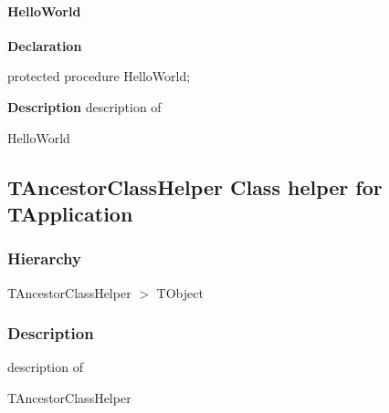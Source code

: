 \documentclass{report}
\newif\ifpdf
\begin{document}
\paragraph*{HelloWorld}\hspace*{\fill}

\label{ok_class_record_helpers.TMyRecordHelper-HelloWorld}
\begin{list}{}{
\setlength{\itemindent}{0cm}
\setlength{\listparindent}{0cm}
\setlength{\leftmargin}{\evensidemargin}
\addtolength{\leftmargin}{\tmplength}
\settowidth{\labelsep}{X}
\addtolength{\leftmargin}{\labelsep}
\setlength{\labelwidth}{\tmplength}
}
\item[\textbf{Declaration}\hfill]
\ifpdf
\begin{flushleft}
\fi
\begin{ttfamily}
protected procedure HelloWorld;\end{ttfamily}

\ifpdf
\end{flushleft}
\fi

\par
\item[\textbf{Description}]
description of \begin{ttfamily}HelloWorld\end{ttfamily}

\end{list}
\ifpdf
\subsection*{\large{\textbf{TAncestorClassHelper Class helper for TApplication}}\normalsize\hspace{1ex}\hrulefill}
\else
\subsection*{TAncestorClassHelper Class helper for TApplication}
\fi
\label{ok_class_record_helpers.TAncestorClassHelper}
\subsubsection*{\large{\textbf{Hierarchy}}\normalsize\hspace{1ex}\hfill}
TAncestorClassHelper {$>$} TObject
\subsubsection*{\large{\textbf{Description}}\normalsize\hspace{1ex}\hfill}
description of \begin{ttfamily}TAncestorClassHelper\end{ttfamily}\ifpdf
\end{document}
